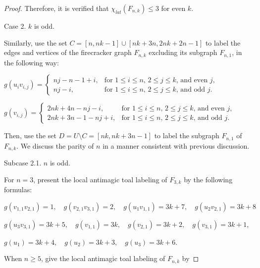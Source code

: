 \documentclass[10pt,a4paper]{amsart}
\begin{document}
\begin{proof}
Therefore, it is verified that $\chi_{lat}(F_{n,k})\leq 3$ for even $k$.

Case 2. $k$ is odd.

Similarly, use the set $C=[n,nk-1]\cup[nk+3n,2nk+2n-1]$ to label the edges and vertices of the firecracker graph $F_{n,k}$ excluding its subgraph $F_{n,1}$, in the following way:\\
\vspace{0.5em}

$g(u_{i}v_{i,j})=\begin{cases}
     nj-n-1+i, & \text{for $1\leq i\leq n$, $2\leq j\leq k$, and even $j$}, \\
     nj-i, & \text{for $1\leq i\leq n$, $2\leq j\leq k$, and odd $j$}. \end{cases}$\vspace{0.5em}

$ g(v_{i,j})=\begin{cases}
     2nk+4n-nj-i, & \text{for $1\leq i\leq n$, $2\leq j\leq k$, and even $j$}, \\
     2nk+3n-1-nj+i, & \text{for $1\leq i\leq n$, $2\leq j\leq k$, and odd $j$}. \end{cases}$\vspace{0.5em}

Then, use the set $D=U\setminus C=[nk,nk+3n-1]$ to label the subgraph $F_{n,1}$ of $F_{n,k}$. We discuss the parity of $n$ in a manner consistent with previous discussion.

Subcase 2.1. $n$ is odd.

For $n=3$,  present the local antimagic toal labeling of $F_{3,k}$ by the following formulas:

$g(v_{1,1}v_{2,1})=1,\hspace{1em}g(v_{2,1}v_{3,1})=2,\hspace{1em}g(u_{1}v_{1,1})=3k+7,\hspace{1em}g(u_{2}v_{2,1})=3k+8$

$g(u_{3}v_{3,1})=3k+5,\hspace{1em}g(v_{1,1})=3k,\hspace{1em}g(v_{2,1})=3k+2,\hspace{1em}g(v_{3,1})=3k+1$,

$g(u_{1})=3k+4,\hspace{1em}g(u_{2})=3k+3,\hspace{1em}g(u_{3})=3k+6$.

When $n\geq 5$, give the local antimagic toal labeling of $F_{n,k}$ by\vspace{0.6em}


\end{proof}
\end{document}
